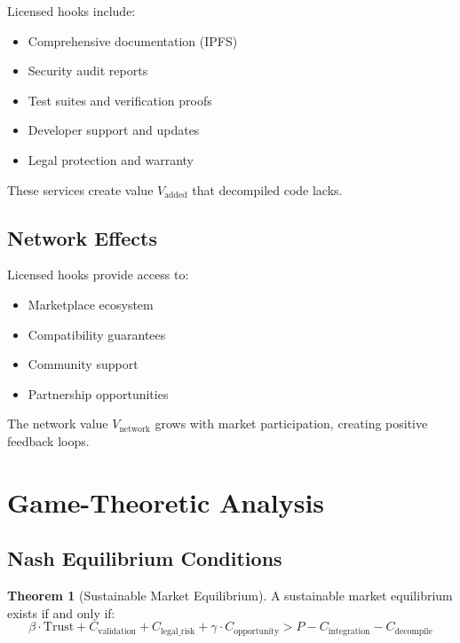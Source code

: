 \documentclass[11pt,a4paper]{article}
\theoremstyle{definition}
\newtheorem{theorem}{Theorem}[section]
\theoremstyle{remark}
\begin{document}
Licensed hooks include:
\begin{itemize}
    \item Comprehensive documentation (IPFS)
    \item Security audit reports
    \item Test suites and verification proofs
    \item Developer support and updates
    \item Legal protection and warranty
\end{itemize}

These services create value $V_{\text{added}}$ that decompiled code lacks.

\subsection{Network Effects}

Licensed hooks provide access to:
\begin{itemize}
    \item Marketplace ecosystem
    \item Compatibility guarantees
    \item Community support
    \item Partnership opportunities
\end{itemize}

The network value $V_{\text{network}}$ grows with market participation, creating positive feedback loops.


\section{Game-Theoretic Analysis}
\label{sec:analysis}

\subsection{Nash Equilibrium Conditions}

\begin{theorem}[Sustainable Market Equilibrium]
A sustainable market equilibrium exists if and only if:
\begin{equation}
\beta \cdot \text{Trust} + C_{\text{validation}} + C_{\text{legal\_risk}} + \gamma \cdot C_{\text{opportunity}} > P - C_{\text{integration}} - C_{\text{decompile}}
\end{equation}
\end{theorem}
\end{document}
